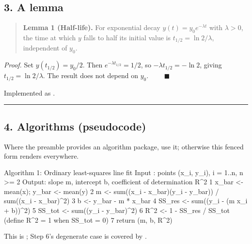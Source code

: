 \documentclass[
]{article}
\newenvironment{Shaded}{}{}
\newcommand{\NormalTok}[1]{#1}
\theoremstyle{plain}
\theoremstyle{definition}
\begin{document}
\subsection{3. A lemma}\label{a-lemma}

\begin{quote}
\textbf{Lemma 1 (Half-life).} For exponential decay
\(y(t) = y_0 e^{-\lambda t}\) with \(\lambda > 0\), the time at which
\(y\) falls to half its initial value is \(t_{1/2} = \ln 2 / \lambda\),
independent of \(y_0\).
\end{quote}

\emph{Proof.} Set \(y(t_{1/2}) = y_0/2\). Then
\(e^{-\lambda t_{1/2}} = 1/2\), so \(-\lambda t_{1/2} = -\ln 2\), giving
\(t_{1/2} = \ln 2 / \lambda\). The result does not depend on \(y_0\).
\(\qquad\blacksquare\)

Implemented as .

\begin{center}\rule{0.5\linewidth}{0.5pt}\end{center}

\subsection{4. Algorithms (pseudocode)}\label{algorithms-pseudocode}

Where the preamble provides an algorithm package, use it; otherwise this
fenced form renders everywhere.

\begin{Shaded}
\begin{Highlighting}[]
\NormalTok{Algorithm 1: Ordinary least{-}squares line fit}
\NormalTok{Input : points (x\_i, y\_i), i = 1..n,  n \textgreater{}= 2}
\NormalTok{Output: slope m, intercept b, coefficient of determination R\^{}2}
\NormalTok{1  x\_bar \textless{}{-} mean(x);  y\_bar \textless{}{-} mean(y)}
\NormalTok{2  m \textless{}{-} sum((x\_i {-} x\_bar)(y\_i {-} y\_bar)) / sum((x\_i {-} x\_bar)\^{}2)}
\NormalTok{3  b \textless{}{-} y\_bar {-} m * x\_bar}
\NormalTok{4  SS\_res \textless{}{-} sum((y\_i {-} (m x\_i + b))\^{}2)}
\NormalTok{5  SS\_tot \textless{}{-} sum((y\_i {-} y\_bar)\^{}2)}
\NormalTok{6  R\^{}2 \textless{}{-} 1 {-} SS\_res / SS\_tot      (define R\^{}2 = 1 when SS\_tot = 0)}
\NormalTok{7  return (m, b, R\^{}2)}
\end{Highlighting}
\end{Shaded}

This is ; Step 6's degenerate case
is covered by
.
\end{document}
